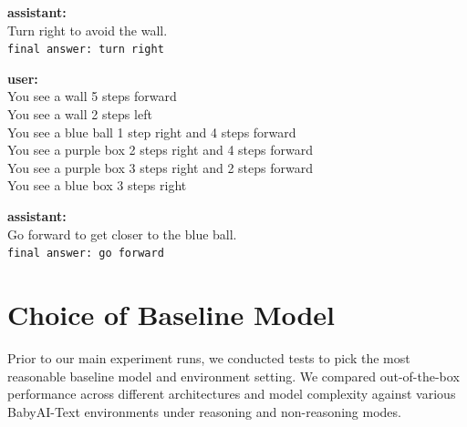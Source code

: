 \documentclass[11pt,a4paper]{article}
\begin{document}
\begin{tcolorbox}
  \begin{tcolorbox}[
    enhanced,
    colback=blue!5,
    colframe=blue!50,
    boxrule=0.5pt,
    arc=2pt,
    outer arc=2pt,
    top=2pt,
    bottom=2pt,
    left=4pt,
    right=4pt,
    boxsep=2pt
  ]
    \textbf{assistant:}\\[4pt]
    Turn right to avoid the wall. \\
    \texttt{final answer: turn right}
  \end{tcolorbox}

  \begin{tcolorbox}[
    enhanced,
    colback=green!5,
    colframe=green!50!black,
    boxrule=0.5pt,
    arc=2pt,
    outer arc=2pt,
    top=2pt,
    bottom=2pt,
    left=4pt,
    right=4pt,
    boxsep=2pt
  ]
    \textbf{user:}\\[4pt]
    You see a wall 5 steps forward \\
    You see a wall 2 steps left \\
    You see a blue ball 1 step right and 4 steps forward \\
    You see a purple box 2 steps right and 4 steps forward \\
    You see a purple box 3 steps right and 2 steps forward \\
    You see a blue box 3 steps right
  \end{tcolorbox}

  \begin{tcolorbox}[
    enhanced,
    colback=blue!5,
    colframe=blue!50,
    boxrule=0.5pt,
    arc=2pt,
    outer arc=2pt,
    top=2pt,
    bottom=2pt,
    left=4pt,
    right=4pt,
    boxsep=2pt
  ]
    \textbf{assistant:}\\[4pt]
    Go forward to get closer to the blue ball. \\
    \texttt{final answer: go forward}
  \end{tcolorbox}

\end{tcolorbox}

\newpage
\section{Choice of Baseline Model}
\label{appendix:choice_of_baseline}
Prior to our main experiment runs, we conducted tests to pick the most reasonable baseline model and environment setting. We compared out-of-the-box performance across different architectures and model complexity against various BabyAI-Text environments under reasoning and non-reasoning modes. 
\end{document}

